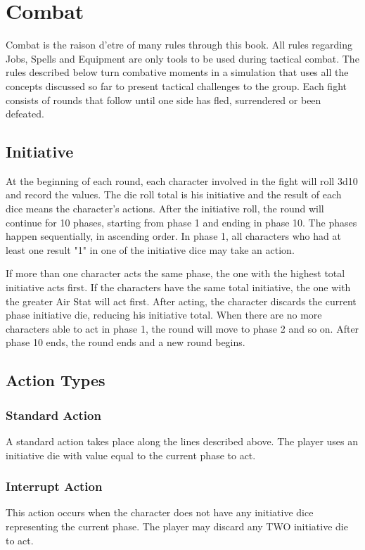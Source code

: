 \section{Combat}
\begin{multicols}{2}
Combat is the raison d’etre of many rules
through this book. All rules regarding Jobs, Spells
and Equipment are only tools to be used during
tactical combat. The rules described below turn
combative moments in a simulation that uses all
the concepts discussed so far to present tactical
challenges to the group. Each fight consists of
rounds that follow until one side has fled,
surrendered or been defeated.

\subsection{Initiative}
At the beginning of each round, each
character involved in the fight will roll 3d10 and
record the values. The die roll total is his initiative
and the result of each dice means the character's
actions. After the initiative roll, the round will
continue for 10 phases, starting from phase 1 and
ending in phase 10. The phases happen
sequentially, in ascending order. In phase 1, all
characters who had at least one result "1" in one of
the initiative dice may take an action.

If more than one character acts the same
phase, the one with the highest total initiative acts
first. If the characters have the same total initiative,
the one with the greater Air Stat will act first. After
acting, the character discards the current phase
initiative die, reducing his initiative total. When
there are no more characters able to act in phase 1,
the round will move to phase 2 and so on. After
phase 10 ends, the round ends and a new round
begins.
\subsection{Action Types}
\subsubsection{Standard Action}
A standard action takes place along the
lines described above. The player uses an initiative
die with value equal to the current phase to act.

\subsubsection{Interrupt Action}
This action occurs when the character
does not have any initiative dice representing the
current phase. The player may discard any TWO
initiative die to act.


\end{multicols}
